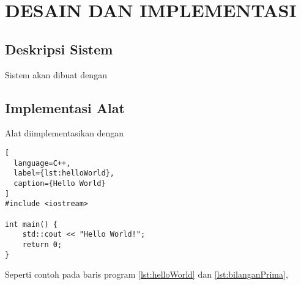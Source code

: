 \chapter{DESAIN DAN IMPLEMENTASI}
\vspace{4ex}

\setlength{\parindent}{7ex}


\section{Deskripsi Sistem}
\vspace{1ex}

Sistem akan dibuat dengan \lipsum[1]
\vspace{0.5ex}

\section{Implementasi Alat}
\vspace{1ex}

Alat diimplementasikan dengan \lipsum[2]
\vspace{0.5ex}

\newpage

\begin{lstlisting}[
  language=C++,
  label={lst:helloWorld},
  caption={Hello World}
]
#include <iostream>

int main() {
    std::cout << "Hello World!";
    return 0;
}
\end{lstlisting}
\vspace{0.5ex}

Seperti contoh pada baris program \ref{lst:helloWorld} dan \ref{lst:bilanganPrima}, \lipsum[3]
\vspace{0.5ex}


\vspace{0.5ex}